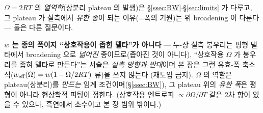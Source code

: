 $\Omega=2RT$ 의 \emph{열역학}(상분리 plateau 의 발생)은 \S\ref{ssec:BW}$\cdot$\S\ref{sec:limits} 가 다루고, 그
plateau 가 실측에서 \emph{유한 종}이 되는 이유(=폭의 기원)는 위 broadening 이 다룬다 --- 둘은 다른 질문이다.
\begin{warnbox}
\textbf{$w$ 는 종의 폭이지 ``상호작용이 좁힌 델타''가 아니다} --- 두-상 실측 봉우리는 평형 델타에서 broadening
으로 \emph{넓어진} 종이므로(좁아진 것이 아니다), ``상호작용 $\Omega$ 가 봉우리를 좁혀 델타로 만든다''는 서술은
\emph{실측 방향과 반대}이며 본 장은 그런 유효-폭 축소식($w_{\mathrm{eff}}(\Omega)=w(1-\Omega/2RT)$ 류)을 쓰지 않는다
(재도입 금지). $\Omega$ 의 역할은 plateau(상분리)를 \emph{만드는} 임계 조건이며(\S\ref{ssec:BW}), 그 plateau
위의 \emph{유한 폭}은 평형이 아니라 현상학적 피팅이 정한다. (상호작용 엔트로피 $\propto\partial\Omega/\partial T$
같은 2차 항이 있을 수 있으나, 흑연에서 소수이고 본 장 범위 밖이다.)
\end{warnbox}


